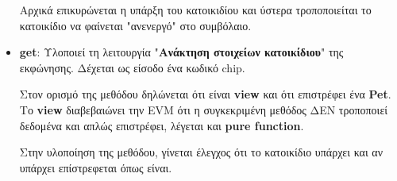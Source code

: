 \documentclass[12pt,a4paper]{article}
\begin{document}
\begin{itemize}
    Αρχικά επικυρώνεται η υπάρξη του κατοικιδίου και ύστερα τροποποιείται το κατοικίδιο να φαίνεται "ανενεργό" στο συμβόλαιο.

    \item \textbf{get}: Υλοποιεί τη λειτουργία "\textbf{Ανάκτηση στοιχείων κατοικίδιου}" της εκφώνησης. Δέχεται ως είσοδο ένα κωδικό chip.
    
    Στον ορισμό της μεθόδου δηλώνεται ότι είναι \textbf{view} και ότι επιστρέφει ένα \textbf{Pet}. Το \textbf{view} διαβεβαιώνει την EVM ότι η συγκεκριμένη μεθόδος ΔΕΝ τροποποιεί δεδομένα και απλώς επιστρέφει, λέγεται και \textbf{pure function}.
    
    Στην υλοποίηση της μεθόδου, γίνεται έλεγχος ότι το κατοικίδιο υπάρχει και αν υπάρχει επίστρεφεται όπως είναι.
\end{itemize}
\end{document}
